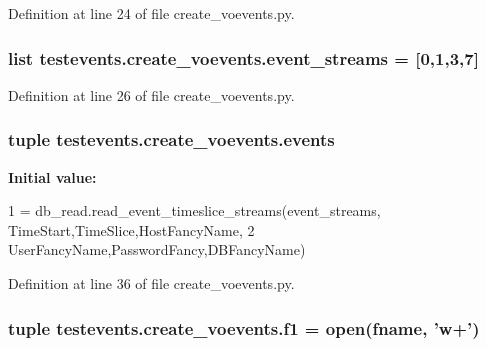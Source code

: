 Definition at line 24 of file create\-\_\-voevents.\-py.

\hypertarget{namespacetestevents_1_1create__voevents_a616c13718ef9e11dffec25cdea829347}{
\subsubsection[{event\-\_\-streams}]{\setlength{\rightskip}{0pt plus 5cm}list testevents.\-create\-\_\-voevents.\-event\-\_\-streams = \mbox{[}0,1,3,7\mbox{]}}}\label{namespacetestevents_1_1create__voevents_a616c13718ef9e11dffec25cdea829347}


Definition at line 26 of file create\-\_\-voevents.\-py.

\hypertarget{namespacetestevents_1_1create__voevents_ad445227e1dca6e875f1f85de9777d008}{
\subsubsection[{events}]{\setlength{\rightskip}{0pt plus 5cm}tuple testevents.\-create\-\_\-voevents.\-events}}\label{namespacetestevents_1_1create__voevents_ad445227e1dca6e875f1f85de9777d008}
{\bfseries Initial value\-:}
\begin{DoxyCode}
1 = db\_read.read\_event\_timeslice\_streams(event\_streams, TimeStart,TimeSlice,HostFancyName,
2                                     UserFancyName,PasswordFancy,DBFancyName)
\end{DoxyCode}


Definition at line 36 of file create\-\_\-voevents.\-py.

\hypertarget{namespacetestevents_1_1create__voevents_ab8cf18f8fb2b4e2eccd7953918cb1760}{
\subsubsection[{f1}]{\setlength{\rightskip}{0pt plus 5cm}tuple testevents.\-create\-\_\-voevents.\-f1 = open({\bf fname}, 'w+')}}\label{namespacetestevents_1_1create__voevents_ab8cf18f8fb2b4e2eccd7953918cb1760}


